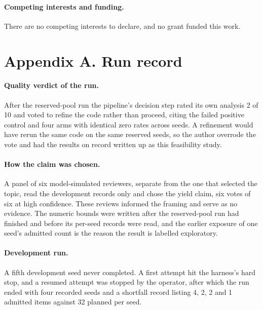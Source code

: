 \documentclass[11pt]{article}
\begin{document}
\paragraph{Competing interests and funding.} There are no competing interests to declare, and no grant funded this work.

\section{Appendix A. Run record}\label{appendix-a.-run-record}

\paragraph{Quality verdict of the run.} After the reserved-pool run the pipeline's decision step rated its own analysis 2 of 10 and voted to refine the code rather than proceed, citing the failed positive control and four arms with identical zero rates across seeds. A refinement would have rerun the same code on the same reserved seeds, so the author overrode the vote and had the results on record written up as this feasibility study.

\paragraph{How the claim was chosen.} A panel of six model-simulated reviewers, separate from the one that selected the topic, read the development records only and chose the yield claim, six votes of six at high confidence. These reviews informed the framing and serve as no evidence. The numeric bounds were written after the reserved-pool run had finished and before its per-seed records were read, and the earlier exposure of one seed's admitted count is the reason the result is labelled exploratory.

\paragraph{Development run.} A fifth development seed never completed. A first attempt hit the harness's hard stop, and a resumed attempt was stopped by the operator, after which the run ended with four recorded seeds and a shortfall record listing 4, 2, 2 and 1 admitted items against 32 planned per seed.
\end{document}
